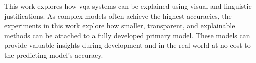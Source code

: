     This work explores how \gls{vqa} systems can be explained using visual and linguistic justifications. As complex models often achieve the highest accuracies, the experiments in this work explore how smaller, transparent, and explainable methods can be attached to a fully developed primary model. These models can provide valuable insights during development and in the real world at no cost to the predicting model's accuracy.
        


